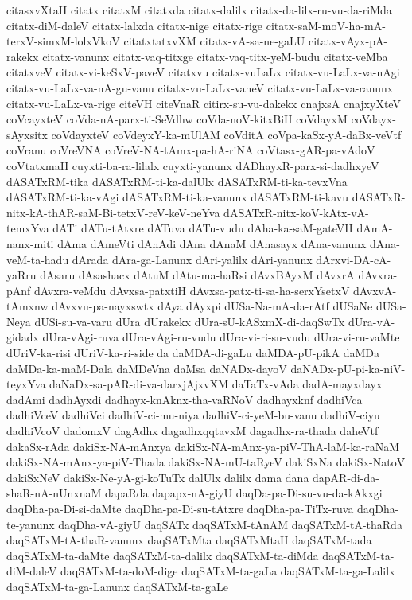 {citasxvXtaH
citatx
citatxM
citatxda
citatx-dalilx
citatx-da-lilx-ru-vu-da-riMda
citatx-diM-daleV
citatx-lalxda
citatx-nige
citatx-rige
citatx-saM-moV-ha-mA-terxV-simxM-lolxVkoV
citatxtatxvXM
citatx-vA-sa-ne-gaLU
citatx-vAyx-pA-rakekx
citatx-vanunx
citatx-vaq-titxge
citatx-vaq-titx-yeM-budu
citatx-veMba
citatxveV
citatx-vi-keSxV-paveV
citatxvu
citatx-vuLaLx
citatx-vu-LaLx-va-nAgi
citatx-vu-LaLx-va-nA-gu-vanu
citatx-vu-LaLx-vaneV
citatx-vu-LaLx-va-ranunx
citatx-vu-LaLx-va-rige
citeVH
citeVnaR
citirx-su-vu-dakekx
cnajxsA
cnajxyXteV
coVcayxteV
coVda-nA-parx-ti-SeVdhw
coVda-noV-kitxBiH
coVdayxM
coVdayx-sAyxsitx
coVdayxteV
coVdeyxY-ka-mUlAM
coVditA
coVpa-kaSx-yA-daBx-veVtf
coVranu
coVreVNA
coVreV-NA-tAmx-pa-hA-riNA
coVtasx-gAR-pa-vAdoV
coVtatxmaH
cuyxti-ba-ra-lilalx
cuyxti-yanunx
dADhayxR-parx-si-dadhxyeV
dASATxRM-tika
dASATxRM-ti-ka-dalUlx
dASATxRM-ti-ka-tevxVna
dASATxRM-ti-ka-vAgi
dASATxRM-ti-ka-vanunx
dASATxRM-ti-kavu
dASATxR-nitx-kA-thAR-saM-Bi-tetxV-reV-keV-neYva
dASATxR-nitx-koV-kAtx-vA-temxYva
dATi
dATu-tAtxre
dATuva
dATu-vudu
dAha-ka-saM-gateVH
dAmA-nanx-miti
dAma
dAmeVti
dAnAdi
dAna
dAnaM
dAnasayx
dAna-vanunx
dAna-veM-ta-hadu
dArada
dAra-ga-Lanunx
dAri-yalilx
dAri-yanunx
dArxvi-DA-cA-yaRru
dAsaru
dAsashacx
dAtuM
dAtu-ma-haRsi
dAvxBAyxM
dAvxrA
dAvxra-pAnf
dAvxra-veMdu
dAvxsa-patxtiH
dAvxsa-patx-ti-sa-ha-serxYsetxV
dAvxvA-tAmxnw
dAvxvu-pa-nayxswtx
dAya
dAyxpi
dUSa-Na-mA-da-rAtf
dUSaNe
dUSa-Neya
dUSi-su-va-varu
dUra
dUrakekx
dUra-sU-kASxmX-di-daqSwTx
dUra-vA-gidadx
dUra-vAgi-ruva
dUra-vAgi-ru-vudu
dUra-vi-ri-su-vudu
dUra-vi-ru-vaMte
dUriV-ka-risi
dUriV-ka-ri-side
da
daMDA-di-gaLu
daMDA-pU-pikA
daMDa
daMDa-ka-maM-Dala
daMDeVna
daMsa
daNADx-dayoV
daNADx-pU-pi-ka-niV-teyxYva
daNaDx-sa-pAR-di-va-darxjAjxvXM
daTaTx-vAda
dadA-mayxdayx
dadAmi
dadhAyxdi
dadhayx-knAknx-tha-vaRNoV
dadhayxknf
dadhiVca
dadhiVceV
dadhiVci
dadhiV-ci-mu-niya
dadhiV-ci-yeM-bu-vanu
dadhiV-ciyu
dadhiVcoV
dadomxV
dagAdhx
dagadhxqqtavxM
dagadhx-ra-thada
daheVtf
dakaSx-rAda
dakiSx-NA-mAnxya
dakiSx-NA-mAnx-ya-piV-ThA-laM-ka-raNaM
dakiSx-NA-mAnx-ya-piV-Thada
dakiSx-NA-mU-taRyeV
dakiSxNa
dakiSx-NatoV
dakiSxNeV
dakiSx-Ne-yA-gi-koTuTx
dalUlx
dalilx
dama
dana
dapAR-di-da-shaR-nA-nUnxnaM
dapaRda
dapapx-nA-giyU
daqDa-pa-Di-su-vu-da-kAkxgi
daqDha-pa-Di-si-daMte
daqDha-pa-Di-su-tAtxre
daqDha-pa-TiTx-ruva
daqDha-te-yanunx
daqDha-vA-giyU
daqSATx
daqSATxM-tAnAM
daqSATxM-tA-thaRda
daqSATxM-tA-thaR-vanunx
daqSATxMta
daqSATxMtaH
daqSATxM-tada
daqSATxM-ta-daMte
daqSATxM-ta-dalilx
daqSATxM-ta-diMda
daqSATxM-ta-diM-daleV
daqSATxM-ta-doM-dige
daqSATxM-ta-gaLa
daqSATxM-ta-ga-Lalilx
daqSATxM-ta-ga-Lanunx
daqSATxM-ta-gaLe
}
